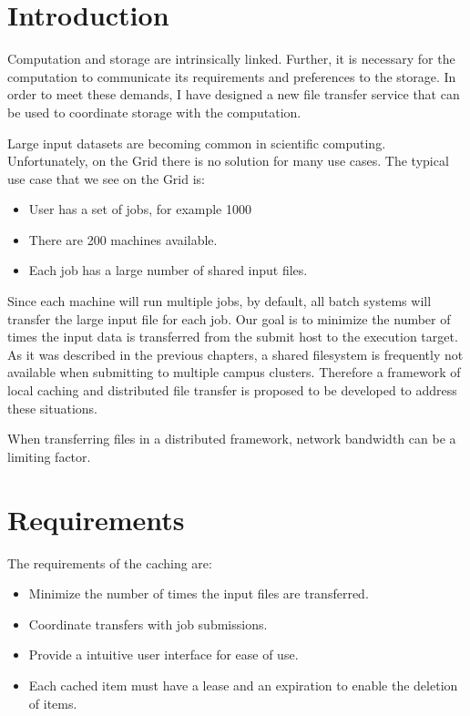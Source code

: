 \label{chapter:coordinatingstorage}


\section{Introduction}

Computation and storage are intrinsically linked.  Further, it is necessary for the computation to communicate its requirements and preferences to the storage.  In order to meet these demands, I have designed a new file transfer service that can be used to coordinate storage with the computation.  

Large input datasets are becoming common in scientific computing.  Unfortunately, on the Grid there is no solution for many use cases.  The typical use case that we see on the Grid is:

\begin{itemize}

\item User has a set of jobs, for example 1000
\item There are 200 machines available.
\item Each job has a large number of shared input files.

\end{itemize}

Since each machine will run multiple jobs, by default, all batch systems will transfer the large input file for each job.  Our goal is to minimize the number of times the input data is transferred from the submit host to the execution target.  As it was described in the previous chapters, a shared filesystem is frequently not available when submitting to multiple campus clusters.  Therefore a framework of local caching and distributed file transfer is proposed to be developed to address these situations.

When transferring files in a distributed framework, network bandwidth can be a limiting factor. 


\section{Requirements}

The requirements of the caching are:
\begin{itemize}
\item Minimize the number of times the input files are transferred.
\item Coordinate transfers with job submissions.
\item Provide a intuitive user interface for ease of use.
\item Each cached item must have a lease and an expiration to enable the deletion of items.
\end{itemize}

